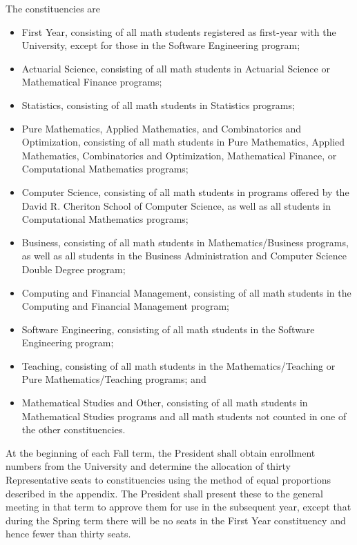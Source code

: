 The constituencies are
\begin{itemize}
  \item First Year, consisting of all math students registered as first-year
    with the University, except for those in the Software Engineering program;
  \item Actuarial Science, consisting of all math students in Actuarial Science
    or Mathematical Finance programs;
  \item Statistics, consisting of all math students in Statistics programs;
  \item Pure Mathematics, Applied Mathematics, and Combinatorics and
    Optimization, consisting of all math students in Pure Mathematics, Applied
    Mathematics, Combinatorics and Optimization, Mathematical Finance, or
    Computational Mathematics programs;
  \item Computer Science, consisting of all math students in programs offered by
    the David R. Cheriton School of Computer Science, as well as all students in
    Computational Mathematics programs;
  \item Business, consisting of all math students in Mathematics/Business
    programs, as well as all students in the Business Administration and
    Computer Science Double Degree program;
  \item Computing and Financial Management, consisting of all math students in
    the Computing and Financial Management program;
  \item Software Engineering, consisting of all math students in the Software
    Engineering program;
  \item Teaching, consisting of all math students in the
    Mathematics/Teaching or Pure Mathematics/Teaching programs;
    and
  \item Mathematical Studies and Other, consisting of all math students in
    Mathematical Studies programs and all math students not counted in one of
    the other constituencies.
\end{itemize}

At the beginning of each Fall term, the President shall obtain enrollment
numbers from the University and determine the allocation of thirty
Representative seats to constituencies using the method of equal proportions
described in the appendix. The President shall present these to the general
meeting in that term to approve them for use in the subsequent year, except that
during the Spring term there will be no seats in the First Year constituency and
hence fewer than thirty seats.

